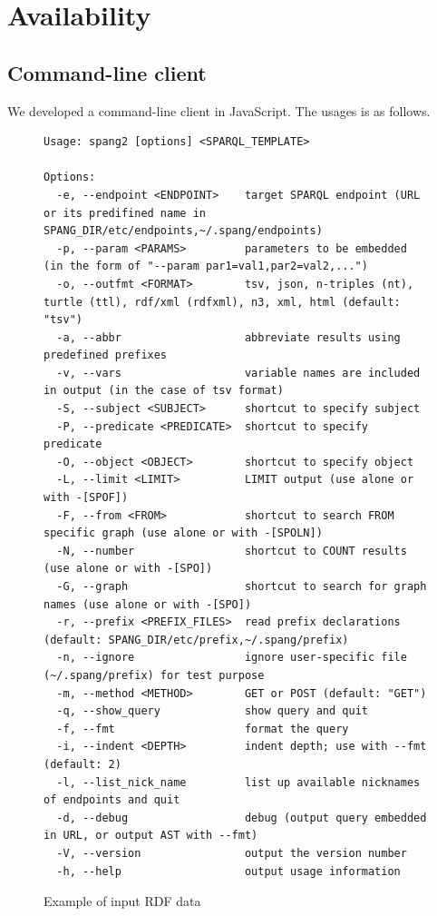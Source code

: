 \documentclass[runningheads]{llncs}
\begin{document}
\section{Availability}
\subsection{Command-line client}
We developed a command-line client in JavaScript.
The usages is as follows.



\begin{figure}[!t]
\begin{scriptsize}
\begin{verbatim}
Usage: spang2 [options] <SPARQL_TEMPLATE>

Options:
  -e, --endpoint <ENDPOINT>    target SPARQL endpoint (URL or its predifined name in SPANG_DIR/etc/endpoints,~/.spang/endpoints)
  -p, --param <PARAMS>         parameters to be embedded (in the form of "--param par1=val1,par2=val2,...")
  -o, --outfmt <FORMAT>        tsv, json, n-triples (nt), turtle (ttl), rdf/xml (rdfxml), n3, xml, html (default: "tsv")
  -a, --abbr                   abbreviate results using predefined prefixes
  -v, --vars                   variable names are included in output (in the case of tsv format)
  -S, --subject <SUBJECT>      shortcut to specify subject
  -P, --predicate <PREDICATE>  shortcut to specify predicate
  -O, --object <OBJECT>        shortcut to specify object
  -L, --limit <LIMIT>          LIMIT output (use alone or with -[SPOF])
  -F, --from <FROM>            shortcut to search FROM specific graph (use alone or with -[SPOLN])
  -N, --number                 shortcut to COUNT results (use alone or with -[SPO])
  -G, --graph                  shortcut to search for graph names (use alone or with -[SPO])
  -r, --prefix <PREFIX_FILES>  read prefix declarations (default: SPANG_DIR/etc/prefix,~/.spang/prefix)
  -n, --ignore                 ignore user-specific file (~/.spang/prefix) for test purpose
  -m, --method <METHOD>        GET or POST (default: "GET")
  -q, --show_query             show query and quit
  -f, --fmt                    format the query
  -i, --indent <DEPTH>         indent depth; use with --fmt (default: 2)
  -l, --list_nick_name         list up available nicknames of endpoints and quit
  -d, --debug                  debug (output query embedded in URL, or output AST with --fmt)
  -V, --version                output the version number
  -h, --help                   output usage information

\end{verbatim}
\end{scriptsize}
\caption{Example of input RDF data}
\label{fig:example-rdf}
\end{figure}
\end{document}
